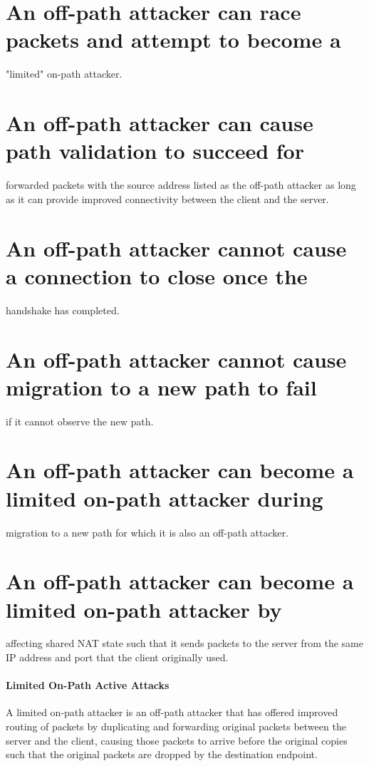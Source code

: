 \documentclass{article}
\begin{document}
\section{An off-path attacker can race packets and attempt to become a}

"limited" on-path attacker.

\section{An off-path attacker can cause path validation to succeed for}

forwarded packets with the source address listed as the off-path attacker as long as it can provide improved connectivity between the client and the server.

\section{An off-path attacker cannot cause a connection to close once the}

handshake has completed.

\section{An off-path attacker cannot cause migration to a new path to fail}

if it cannot observe the new path.

\section{An off-path attacker can become a limited on-path attacker during}

migration to a new path for which it is also an off-path attacker.

\section{An off-path attacker can become a limited on-path attacker by}

affecting shared NAT state such that it sends packets to the server from the same IP address and port that the client originally used.

\paragraph{Limited On-Path Active Attacks}

A limited on-path attacker is an off-path attacker that has offered improved routing of packets by duplicating and forwarding original packets between the server and the client, causing those packets to arrive before the original copies such that the original packets are dropped by the destination endpoint.
\end{document}
